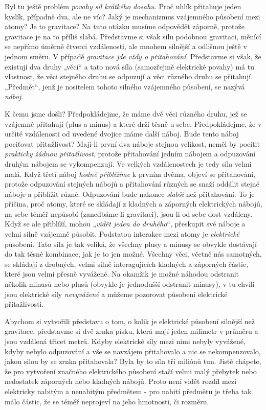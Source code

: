     Byl tu ještě problém \emph{povahy sil krátkého dosahu}. Proč uhlík přitahuje jeden kyslík, 
    případně dva, ale ne víc? Jaký je mechanizmus vzájemného působení mezi atomy? Je to gravitace? 
    Na tuto otázku musíme odpovědět záporně, protože gravitace je na to příliš slabá. Představme si 
    však sílu podobnou gravitaci, měnící se nepřímo úměrně čtverci vzdálenosti, ale mnohem silnější 
    a odlišnou ještě v jednom směru. V případě \emph{gravitace jde vždy o přitahování}. Představme 
    si však, že existují dva druhy „věcí“ a tato nová síla  (samozřejmě elektrické povahy) má tu 
    vlastnost, že věci stejného druhu se odpuzují a věci různého druhu se přitahují. „Předmět“, 
    jenž je nositelem tohoto silného vzájemného působení, se nazývá \emph{náboj}.  
    
    K čemu jsme došli? Předpokládejme, že máme dvě věci různého druhu, jež se vzájemně  
    přitahují (plus a minus) a které drží těsně u sebe. Předpokládejme, že v určité vzdálenosti od 
    uvedené dvojice máme další náboj. Bude tento náboj pociťovat přitažlivost? Mají-li první dva 
    náboje stejnou velikost, neměl by pocítit \emph{prakticky žádnou přitažlivost}, protože 
    přitahování jedním nábojem a odpuzování druhým nábojem se vykompenzují. Ve velkých 
    vzdálenostech je tedy síla velmi malá. Když třetí náboj \emph{hodně přiblížíme} k prvním dvěma, 
    objeví se přitahování, protože odpuzování stejných nábojů a přitahování různých se snaží 
    oddálit stejné náboje a přiblížit různé. Odpuzování bude nakonec \emph{slabší} než přitahování. 
    To je příčina, proč atomy, které se skládají z kladných a záporných elektrických nábojů, na 
    sebe téměř nepůsobí (zanedbáme-li gravitaci), jsou-li od sebe dost vzdáleny. Když se ale 
    přiblíží, mohou „\emph{vidět jeden do druhého}“, přeskupit své náboje a velmi silně vzájemně 
    působit. Podstatou interakce mezi atomy je \emph{elektrické} působení. Tato síla je tak veliká, 
    že všechny plusy a minusy se obvykle dostávají do tak těsné kombinace, jak je to jen možné. 
    Všechny věci, včetně nás samotných, se skládají z drobných, velmi silně interagujících kladných 
    a záporných částic, které jsou velmi přesně vyvážené. Na okamžik je možné náhodou odstranit 
    několik minusů nebo plusů (obvykle je jednodušší odstranit minusy), v tu chvíli jsou elektrické 
    síly \emph{nevyvážené} a můžeme pozorovat působení elektrické přitažlivosti.
    
    Abychom si vytvořili představu o tom, o kolik je elektrické působení silnější než gravitace, 
    představme si dvě zrnka písku, která mají jeden milimetr v průměru a jsou vzdálená třicet 
    metrů. Kdyby elektrické síly mezi nimi nebyly vyvážené, kdyby nebylo odpuzování a vše se 
    navzájem přitahovalo a nic se nekompenzovalo, jakou silou by se zrnka přitahovala? Byla by to 
    síla tří miliónů tun. Jistě chápete, že pro vytvoření značného elektrického působení stačí 
    velmi malý přebytek nebo nedostatek záporných nebo kladných nábojů. Proto není vidět rozdíl 
    mezi elektricky nabitým a nenabitým předmětem - pro nabití předmětu je třeba tak málo částic, 
    že se téměř neprojeví na jeho hmotnosti, či rozměru.
    
